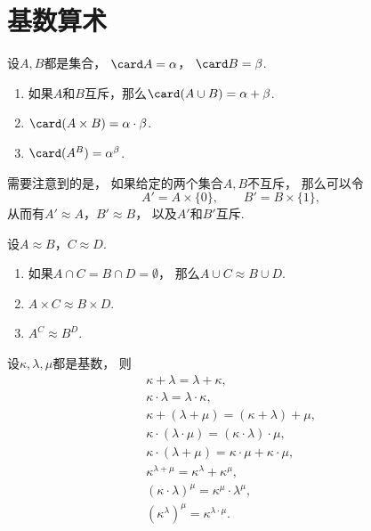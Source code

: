 \section{基数算术}
\begin{definition}\label{definition:基数.基数算术的定义}
设\(A,B\)都是集合，
\(\card A = \alpha\)，
\(\card B = \beta\).
\begin{enumerate}
	\item 如果\(A\)和\(B\)互斥，那么\(\card(A \cup B)=\alpha+\beta\).
	\item \(\card(A \times B)=\alpha\cdot\beta\).
	\item \(\card(A^B)=\alpha^\beta\).
\end{enumerate}
\end{definition}

需要注意到的是，
如果给定的两个集合\(A,B\)不互斥，
那么可以令\begin{equation*}
	A' = A\times\{0\}, \qquad
	B' = B\times\{1\},
\end{equation*}
从而有\(A' \approx A\)，\(B' \approx B\)，
以及\(A'\)和\(B'\)互斥.

\begin{theorem}
设\(A \approx B\)，\(C \approx D\).
\begin{enumerate}
	\item 如果\(A \cap C = B \cap D = \emptyset\)，
	那么\(A \cup C \approx B \cup D\).
	\item \(A \times C \approx B \times D\).
	\item \(A^C \approx B^D\).
\end{enumerate}
\end{theorem}

\begin{theorem}
设\(\kappa,\lambda,\mu\)都是基数，
则\begin{gather}
	\kappa + \lambda = \lambda + \kappa, \\
	\kappa \cdot \lambda = \lambda \cdot \kappa, \\
	\kappa + (\lambda + \mu) = (\kappa + \lambda) + \mu, \\
	\kappa \cdot (\lambda \cdot \mu) = (\kappa \cdot \lambda) \cdot \mu, \\
	\kappa \cdot (\lambda + \mu) = \kappa \cdot \mu + \kappa \cdot \mu, \\
	\kappa^{\lambda+\mu} = \kappa^\lambda + \kappa^\mu, \\
	(\kappa \cdot \lambda)^\mu = \kappa^\mu \cdot \lambda^\mu, \\
	(\kappa^\lambda)^\mu = \kappa^{\lambda \cdot \mu}.
\end{gather}
\end{theorem}

